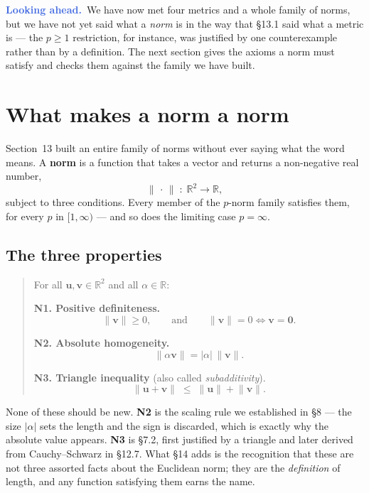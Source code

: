 \documentclass[11pt]{article}
\theoremstyle{definition}
\theoremstyle{remark}
\newcommand{\lookahead}{\par\smallskip\noindent
  \textbf{\sffamily\textcolor{RoyalBlue}{Looking ahead.}}\ \ignorespaces}
\newcommand{\R}{\mathbb{R}}
\newcommand{\vc}[1]{\mathbf{#1}}
\newcommand{\norm}[1]{\lVert #1\rVert}
\begin{document}
\lookahead We have now met four metrics and a whole family of norms, but we have
not yet said what a \emph{norm} is in the way that \S13.1 said what a metric is
--- the $p\ge1$ restriction, for instance, was justified by one counterexample
rather than by a definition. The next section gives the axioms a norm must
satisfy and checks them against the family we have built.

\section{What makes a norm a norm}
Section~13 built an entire family of norms without ever saying what the word
means. A \textbf{norm} is a function that takes a vector and returns a
non-negative real number,
\[
  \norm{\,\cdot\,}\;:\;\R^{2}\to\R ,
\]
subject to three conditions. Every member of the $p$-norm family satisfies them,
for every $p$ in $[1,\infty)$ --- and so does the limiting case $p=\infty$.

\subsection{The three properties}
\begin{quote}
For all $\vc{u},\vc{v}\in\R^{2}$ and all $\alpha\in\R$:

\smallskip
\textbf{N1. Positive definiteness.}
\[
  \norm{\vc{v}}\ge 0,
  \qquad\text{and}\qquad
  \norm{\vc{v}}=0 \iff \vc{v}=\vc{0}.
\]

\smallskip
\textbf{N2. Absolute homogeneity.}
\[
  \norm{\alpha\vc{v}} = \lvert\alpha\rvert\,\norm{\vc{v}} .
\]

\smallskip
\textbf{N3. Triangle inequality} (also called \emph{subadditivity}).
\[
  \norm{\vc{u}+\vc{v}} \;\le\; \norm{\vc{u}}+\norm{\vc{v}} .
\]
\end{quote}

\noindent None of these should be new. \textbf{N2} is the scaling rule we
established in \S8 --- the size $\lvert\alpha\rvert$ sets the length and the sign
is discarded, which is exactly why the absolute value appears. \textbf{N3} is
\S7.2, first justified by a triangle and later derived from Cauchy--Schwarz in
\S12.7. What \S14 adds is the recognition that these are not three assorted
facts about the Euclidean norm; they are the \emph{definition} of length, and any
function satisfying them earns the name.
\end{document}

